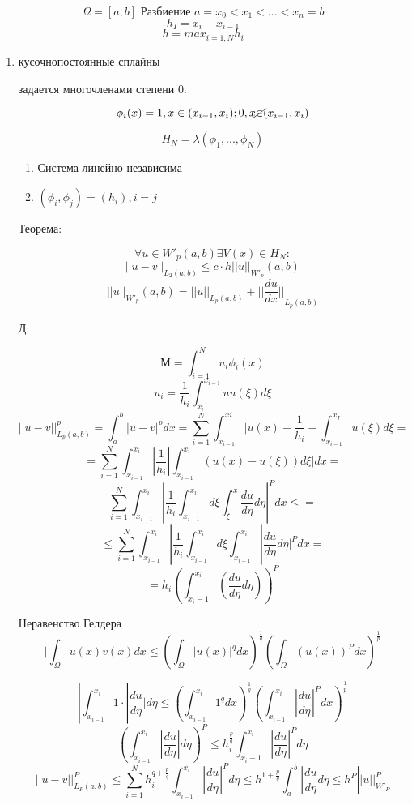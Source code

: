 \documentclass[12pt, a4paper]{article}
\begin{document}
\[ \Omega = [a, b]\textrm{ Разбиение } a = x_0 < x_1 < ... < x_n = b \]
\[ h_I = x_i - x_{i-1} \]
\[ h = max_{i=1, N} h_i \]
\begin{enumerate}
	\item кусочнопостоянные сплайны

	задается многочленами степени 0.

	\[ \phi_i (x) = {1, x \in (x_{i-1}, x_i)}; 0, x \cancel{\in} (x_{i-1}, x_i) \]

	\[H_N = \lambda(\phi_1, ... , \phi_N) \]

	\begin{enumerate}
		\item Система линейно независима
		\item $ (\phi_i, \phi_j) = (h_i), i=j $
	\end{enumerate}

	Теорема:

	\[ \forall u \in {W'}_{p} (a, b) \exists V(x) \in H_N: \]
	\[ {|| u - v ||}_{L_2(a,b)} \leq c \cdot h {||u||}_{{W'}_p} (a, b) \]
	\[ {||u||}_{W'_p}(a, b) = {||u||}_{L_p (a, b)} + {|| \frac{du}{dx} ||}_{L_p (a, b)} \]

	Д

	\[ М = \int_{i=1}^{N} u_i \phi_i(x) \]
	\[ u_i = \frac{1}{h_i} \int_{x_i}^{x_{i-1}} uu(\xi)d \xi \]
	\[ {||u-v||}^p_{L_p(a,b)} = \int_{a}^{b} {|u - v|}^p dx = \sum_{i=1}^{N} \int_{x_{i-1}}^{xi} |u(x) - \frac{1}{h_i} - \int_{x_{i-1}}^{x_I} u (\xi) d \xi = \]
	\[ = \sum_{i=1}^{N} \int_{x_{i-1}}^{x_i} | \frac{1}{h_i} |\int_{x_{i-1}}^{x_i} (u(x) - u(\xi)) d\xi| dx = \]
	\[ \sum_{i=1}^{N} \int_{x_{i-1}}^{x_i} |\frac{1}{h_i} \int_{x_{i-1}}^{x_i} d \xi \int_{\xi}^{x} \frac{du}{d\eta} d \eta |^P dx \leq =  \]
	\[ \leq \sum_{i=1}^{N} \int_{x_{i-1}}^{x_i} |\frac{1}{h_i} \int_{x_{i-1}}^{x_i} d \xi \int_{x_{i-1}}^{x_i} |\frac{du}{d\eta} d \eta |^P dx = \]
	\[ = h_i (\int_{x_i-1}^{x_i} (\frac{du}{d\eta} d \eta))^P\]

	Неравенство Гелдера
	\[ | \int_{\Omega}^{} u(x) v(x) dx \leq {(\int_{\Omega}^{} |u(x)|^q dx)}^\frac{1}{q} (\int_{\Omega}^{} (u(x))^P dx)^\frac{1}{p} \]

	\[ |\int_{x_{i-1}}^{x_i} 1 \cdot |\frac{du}{d\eta}| d\eta \leq (\int_{x_{i-1}}^{x_i} 1^q dx)^\frac{1}{q} (\int_{x_{i-1}}^{x_i}| \frac{du}{d\eta} |^P dx )^\frac{1}{p} \]
	\[ (\int_{x_{i-1}}^{x_i} | \frac{du}{d\eta}| d\eta)^P \leq h^{\frac{p}{q}}_i \int_{x_i-1}^{x_i} |\frac{du}{d\eta}|^P d\eta \]
	\[ {||u-v||}^P_{L_P(a, b)} \leq \sum_{i=1}^{N} h_i^{q+\frac{p}{q}} \int_{x_{i-1}}^{x_i} |\frac{du}{d\eta}|^P  d\eta \leq h^{1+\frac{p}{q}} \int_{a}^{b} |\frac{du}{d\eta} d\eta \leq h^P ||u||^P_{{W'}_P} \]


\end{enumerate}
\end{document}
